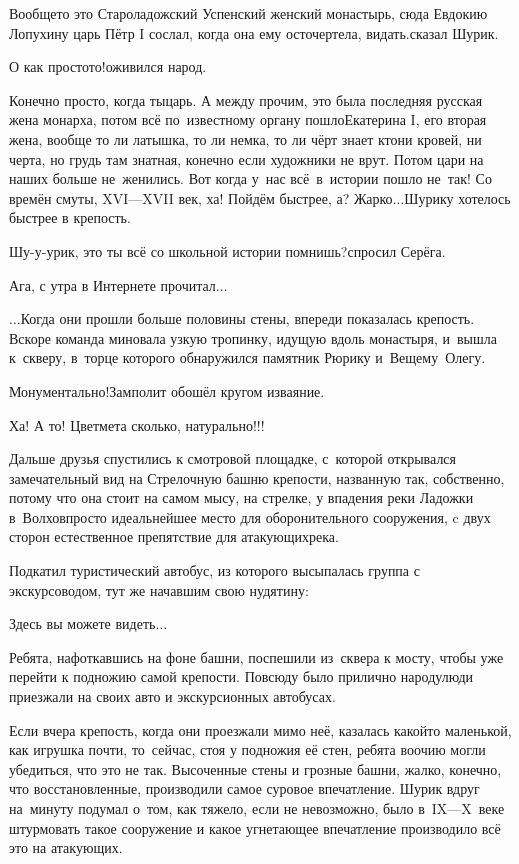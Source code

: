 \diagdash Вообще\sdash то это Староладожский Успенский женский монастырь, сюда Евдокию Лопухину царь Пётр I сослал, когда она ему осточертела, видать.\mdash сказал Шурик.

\diagdash О как просто\sdash то!\mdash оживился народ.

\diagdash Конечно просто, когда ты\mdash царь. А между прочим, это была последняя русская жена монарха, потом всё по~известному органу пошло\mdash Екатерина I, его вторая жена, вообще то ли латышка, то ли немка, то ли чёрт знает кто\mdash ни кровей, ни черта, но грудь там знатная, конечно если художники не врут. Потом цари на наших больше не~женились. Вот когда у~нас всё~в~истории пошло не~так! Со времён смуты, XVI\thinspace\nobreakdash---\thinspace XVII век, ха! Пойдём быстрее, а? Жарко$\ldots$\mdash Шурику  хотелось быстрее в крепость.

\diagdash Шу-у-урик, это ты всё со школьной истории помнишь?\mdash спросил Серёга.

\diagdash Ага, с утра в Интернете прочитал$\ldots$

\vspace{1.0cm}
$\ldots$Когда они прошли больше половины стены, впереди показалась крепость. Вскоре команда миновала узкую тропинку, идущую вдоль монастыря, и~вышла к~скверу, в~торце которого обнаружился памятник Рюрику и~Вещему~Олегу. 

\diagdash Монументально!\mdash Замполит обошёл кругом изваяние.

\diagdash Ха! А то! Цветмета сколько, натурально!!!

Дальше друзья спустились к смотровой площадке, с~которой открывался замечательный вид на Стрелочную башню крепости, названную так, собственно, потому что она стоит на самом мысу, на стрелке, у впадения реки Ладожки в~Волхов\mdash просто идеальнейшее место для оборонительного сооружения, c двух сторон естественное препятствие для атакующих\mdash река.

Подкатил туристический автобус, из которого высыпалась группа с экскурсоводом, тут же начавшим свою нудятину:

\diagdash Здесь вы можете видеть$\ldots$

Ребята, нафоткавшись на фоне башни, поспешили из~сквера к мосту, чтобы уже перейти к подножию самой крепости. Повсюду было прилично народу\mdash люди приезжали на своих авто и экскурсионных автобусах.

Если вчера крепость, когда они проезжали мимо неё, казалась какой\sdash то маленькой, как игрушка почти, то~сейчас, стоя у подножия её стен, ребята воочию могли убедиться, что это не так. Высоченные стены и грозные башни, жалко, конечно, что восстановленные, производили самое суровое впечатление. Шурик вдруг на~минуту подумал о~том, как тяжело, если не невозможно, было в~IX\thinspace\nobreakdash---\thinspace X~веке штурмовать такое сооружение и какое угнетающее впечатление производило всё это на атакующих.

